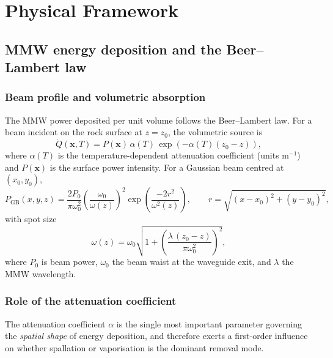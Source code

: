 \documentclass[12pt, a4paper]{article}
\newcommand{\vv}[1]{\bm{#1}}
\begin{document}
\section{Physical Framework}
\label{sec:physics}

\subsection{MMW energy deposition and the Beer--Lambert law}
\label{sec:beam}

\subsubsection{Beam profile and volumetric absorption}

The MMW power deposited per unit volume follows the Beer--Lambert law.  For a
beam incident on the rock surface at $z = z_0$, the volumetric source is
\begin{equation}
    \dot{Q}(\vv{x}, T) = P(\vv{x})\,\alpha(T)\,
                          \exp\!\left(-\alpha(T)(z_0 - z)\right),
    \label{eq:qdot}
\end{equation}
where $\alpha(T)$ is the temperature-dependent attenuation coefficient
(units m$^{-1}$) and $P(\vv{x})$ is the surface power intensity.
For a Gaussian beam centred at $(x_0, y_0)$,
\begin{equation}
    P_\mathrm{GB}(x,y,z) = \frac{2P_0}{\pi\omega_0^2}
            \left(\frac{\omega_0}{\omega(z)}\right)^{\!2}
            \exp\!\left(\frac{-2r^2}{\omega^2(z)}\right),
    \qquad
    r = \sqrt{(x-x_0)^2 + (y-y_0)^2},
    \label{eq:intensity}
\end{equation}
with spot size
\begin{equation}
    \omega(z) = \omega_0\sqrt{1 + \left(\frac{\lambda\,(z_0 - z)}
                                         {\pi\omega_0^2}\right)^{\!2}},
    \label{eq:waist}
\end{equation}
where $P_0$ is beam power, $\omega_0$ the beam waist at the waveguide exit,
and $\lambda$ the MMW wavelength.

\subsubsection{Role of the attenuation coefficient}
\label{sec:attenuation}

The attenuation coefficient $\alpha$ is the single most important parameter
governing the \emph{spatial shape} of energy deposition, and therefore
exerts a first-order influence on whether spallation or vaporisation is
the dominant removal mode.
\end{document}
